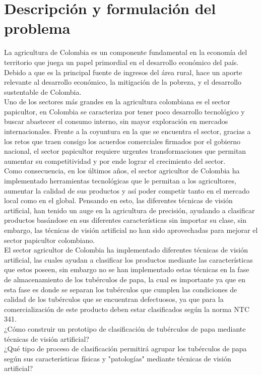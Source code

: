 \section{Descripción y formulación del problema}
La agricultura de Colombia es un componente fundamental en la economía del territorio que juega un papel primordial en el desarrollo económico del país. Debido a que es la principal fuente de ingresos del área rural, hace un aporte relevante al desarrollo económico, la mitigación de la pobreza, y el desarrollo sustentable de Colombia.
\\
Uno de los sectores más   grandes en la agricultura colombiana es el sector papicultor, en Colombia se caracteriza por tener poco desarrollo tecnológico y buscar abastecer el consumo interno, sin mayor exploración en mercados internacionales. Frente a la coyuntura en la que se encuentra el sector, gracias a los retos que traen consigo los acuerdos comerciales firmados por el gobierno nacional, el sector papicultor requiere urgentes transformaciones que permitan aumentar su competitividad y por ende lograr el crecimiento del sector.
\\
Como consecuencia, en los últimos años, el sector agricultor de Colombia ha implementado herramientas tecnológicas que le permitan a los agricultores, aumentar la calidad de sus productos y así poder competir tanto en el mercado local como en el global. Pensando en esto, las diferentes técnicas de visión artificial, han tenido un auge en la agricultura de precisión, ayudando a clasificar productos basándose en sus diferentes características sin importar su clase, sin embargo, las técnicas de visión artificial no han sido aprovechadas para mejorar el sector papicultor colombiano.
\\
El sector agricultor de Colombia ha implementado diferentes técnicas de visión artificial, las cuales ayudan a clasificar los productos mediante las características que estos poseen, sin embargo no se han implementado estas técnicas en la fase de almacenamiento de los tubérculos de papa, la cual es importante ya que en esta fase es donde se separan los tubérculos que cumplen las condiciones de calidad de los tubérculos que se encuentran defectuosos, ya que para la comercialización de este producto deben estar clasificados según la norma NTC 341.
\\ 
¿Cómo construir un prototipo de clasificación de tubérculos de papa mediante técnicas de visión artificial?
\\
¿Qué tipo de proceso de clasificación permitirá agrupar los tubérculos de papa según sus características físicas y "patologías" mediante técnicas de visión artificial?	


